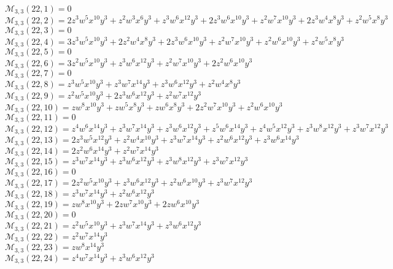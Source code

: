 $\mathcal{M}_{3,3}(22,1)=0$\\
$\mathcal{M}_{3,3}(22,2)=2z^3w^5x^{10}y^3+z^2w^3x^6y^3+z^3w^6x^{12}y^3+2z^3w^6x^{10}y^3+z^2w^7x^{10}y^3+2z^3w^4x^8y^3+z^2w^5x^8y^3$\\
$\mathcal{M}_{3,3}(22,3)=0$\\
$\mathcal{M}_{3,3}(22,4)=3z^3w^5x^{10}y^3+2z^2w^4x^8y^3+2z^3w^6x^{10}y^3+z^2w^7x^{10}y^3+z^2w^6x^{10}y^3+z^2w^5x^8y^3$\\
$\mathcal{M}_{3,3}(22,5)=0$\\
$\mathcal{M}_{3,3}(22,6)=3z^2w^5x^{10}y^3+z^3w^6x^{12}y^3+z^2w^7x^{10}y^3+2z^2w^6x^{10}y^3$\\
$\mathcal{M}_{3,3}(22,7)=0$\\
$\mathcal{M}_{3,3}(22,8)=z^3w^5x^{10}y^3+z^3w^7x^{14}y^3+z^3w^6x^{12}y^3+z^2w^4x^8y^3$\\
$\mathcal{M}_{3,3}(22,9)=z^2w^5x^{10}y^3+2z^3w^6x^{12}y^3+z^2w^7x^{12}y^3$\\
$\mathcal{M}_{3,3}(22,10)=zw^8x^{10}y^3+zw^5x^8y^3+zw^6x^8y^3+2z^2w^7x^{10}y^3+z^2w^6x^{10}y^3$\\
$\mathcal{M}_{3,3}(22,11)=0$\\
$\mathcal{M}_{3,3}(22,12)=z^4w^6x^{14}y^3+z^3w^7x^{14}y^3+z^3w^6x^{12}y^3+z^5w^6x^{14}y^3+z^4w^5x^{12}y^3+z^3w^8x^{12}y^3+z^3w^7x^{12}y^3$\\
$\mathcal{M}_{3,3}(22,13)=2z^3w^5x^{12}y^3+z^2w^4x^{10}y^3+z^3w^7x^{14}y^3+z^2w^6x^{12}y^3+z^3w^6x^{14}y^3$\\
$\mathcal{M}_{3,3}(22,14)=2z^2w^6x^{14}y^3+z^2w^7x^{14}y^3$\\
$\mathcal{M}_{3,3}(22,15)=z^3w^7x^{14}y^3+z^3w^6x^{12}y^3+z^3w^8x^{12}y^3+z^3w^7x^{12}y^3$\\
$\mathcal{M}_{3,3}(22,16)=0$\\
$\mathcal{M}_{3,3}(22,17)=2z^2w^5x^{10}y^3+z^3w^6x^{12}y^3+z^2w^6x^{10}y^3+z^3w^7x^{12}y^3$\\
$\mathcal{M}_{3,3}(22,18)=z^3w^7x^{14}y^3+z^2w^6x^{12}y^3$\\
$\mathcal{M}_{3,3}(22,19)=zw^8x^{10}y^3+2zw^7x^{10}y^3+2zw^6x^{10}y^3$\\
$\mathcal{M}_{3,3}(22,20)=0$\\
$\mathcal{M}_{3,3}(22,21)=z^2w^5x^{10}y^3+z^3w^7x^{14}y^3+z^3w^6x^{12}y^3$\\
$\mathcal{M}_{3,3}(22,22)=z^2w^7x^{14}y^3$\\
$\mathcal{M}_{3,3}(22,23)=zw^8x^{14}y^3$\\
$\mathcal{M}_{3,3}(22,24)=z^4w^7x^{14}y^3+z^3w^6x^{12}y^3$\\
